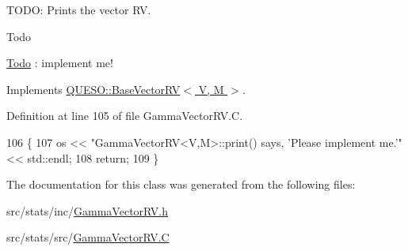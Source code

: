 T\-O\-D\-O\-: Prints the vector R\-V. 

\begin{DoxyRefDesc}{Todo}
\item[\hyperlink{todo__todo000017}{Todo}]\-: implement me! \end{DoxyRefDesc}


Implements \hyperlink{class_q_u_e_s_o_1_1_base_vector_r_v_a5296b918534e12e5b62ac7cb5d20a1e8}{Q\-U\-E\-S\-O\-::\-Base\-Vector\-R\-V$<$ V, M $>$}.



Definition at line 105 of file Gamma\-Vector\-R\-V.\-C.


\begin{DoxyCode}
106 \{
107   os << \textcolor{stringliteral}{"GammaVectorRV<V,M>::print() says, 'Please implement me.'"} << std::endl;
108   \textcolor{keywordflow}{return};
109 \}
\end{DoxyCode}


The documentation for this class was generated from the following files\-:\begin{DoxyCompactItemize}
\item 
src/stats/inc/\hyperlink{_gamma_vector_r_v_8h}{Gamma\-Vector\-R\-V.\-h}\item 
src/stats/src/\hyperlink{_gamma_vector_r_v_8_c}{Gamma\-Vector\-R\-V.\-C}\end{DoxyCompactItemize}

